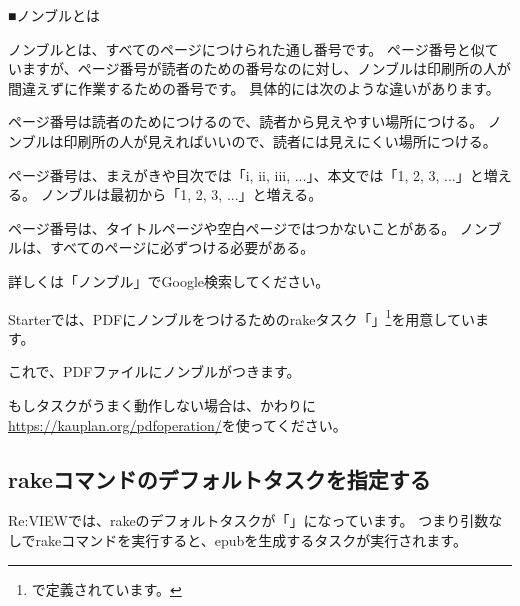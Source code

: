 \begin{starternote}{■ノンブルとは}
\begin{starternoteinner}

ノンブルとは、すべてのページにつけられた通し番号です。
ページ番号と似ていますが、ページ番号が読者のための番号なのに対し、ノンブルは印刷所の人が間違えずに作業するための番号です。
具体的には次のような違いがあります。

\begin{starteritemize}
\item ページ番号は読者のためにつけるので、読者から見えやすい場所につける。
   ノンブルは印刷所の人が見えればいいので、読者には見えにくい場所につける。
\item ページ番号は、まえがきや目次では「i, ii, iii, ...」、本文では「1, 2, 3, ...」と増える。
   ノンブルは最初から「1, 2, 3, ...」と増える。
\item ページ番号は、タイトルページや空白ページではつかないことがある。
   ノンブルは、すべてのページに必ずつける必要がある。
\end{starteritemize}

詳しくは「ノンブル」でGoogle検索してください。

\end{starternoteinner}
\end{starternote}

Starterでは、PDFにノンブルをつけるためのrakeタスク「」\footnote{で定義されています。}を用意しています。

\begin{starterterminal}\end{starterterminal}

これで、PDFファイルにノンブルがつきます。

もしタスクがうまく動作しない場合は、かわりに\url{https://kauplan.org/pdfoperation/}を使ってください。

\subsection*{rakeコマンドのデフォルトタスクを指定する}
\label{sec:1-3-9}

Re:VIEWでは、rakeのデフォルトタスクが「」になっています。
つまり引数なしでrakeコマンドを実行すると、epubを生成するタスクが実行されます。

